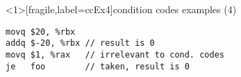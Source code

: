 \begin{frame}<1>[fragile,label=ccEx4]{condition codes examples (4)}
\begin{lstlisting}[language=myasm]
movq $20, %rbx
addq $-20, %rbx // result is 0
movq $1, %rax   // irrelevant to cond. codes
je   foo        // taken, result is 0
\end{lstlisting}
\end{frame}



